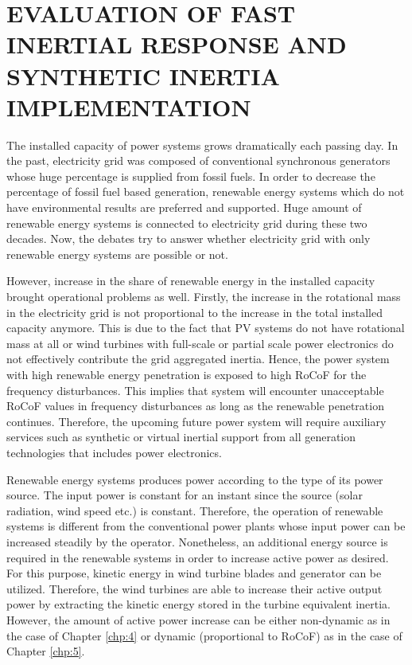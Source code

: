 \chapter{EVALUATION OF FAST INERTIAL RESPONSE AND SYNTHETIC INERTIA IMPLEMENTATION}
\label{chp:6}
The installed capacity of power systems grows dramatically each passing day. In the past, electricity grid was composed of conventional synchronous generators whose huge percentage is supplied from fossil fuels. In order to decrease the percentage of fossil fuel based generation, renewable energy systems which do not have environmental results are preferred and supported. Huge amount of renewable energy systems is connected to electricity grid during these two decades. Now, the debates try to answer whether electricity grid with only renewable energy systems are possible or not. \par
However, increase in the share of renewable energy in the installed capacity brought operational problems as well. Firstly, the increase in the rotational mass in the electricity grid is not proportional to the increase in the total installed capacity anymore. This is due to the fact that PV systems do not have rotational mass at all or wind turbines with full-scale or partial scale power electronics do not effectively contribute the grid aggregated inertia. Hence, the power system with high renewable energy penetration is exposed to high RoCoF for the frequency disturbances. This implies that system will encounter unacceptable RoCoF values in frequency disturbances as long as the renewable penetration continues. Therefore, the upcoming future power system will require auxiliary services such as synthetic or virtual inertial support from all generation technologies that includes power electronics. \par
Renewable energy systems produces power according to the type of its power source. The input power is constant for an instant since the source (solar radiation, wind speed etc.) is constant. Therefore, the operation of renewable systems is different from the conventional power plants whose input power can be increased steadily by the operator. Nonetheless, an additional energy source is required in the renewable systems in order to increase active power as desired. For this purpose, kinetic energy in wind turbine blades and generator can be utilized. Therefore, the wind turbines are able to increase their active output power by extracting the kinetic energy stored in the turbine equivalent inertia. However, the amount of active power increase can be either non-dynamic as in the case of Chapter \ref{chp:4} or dynamic (proportional to RoCoF) as in the case of Chapter \ref{chp:5}.

